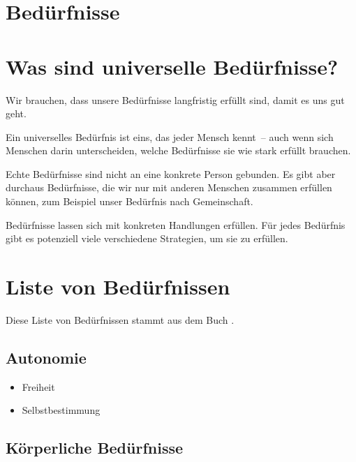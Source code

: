 \section{Bedürfnisse}

\section{Was sind universelle Bedürfnisse?}

Wir brauchen, dass unsere Bedürfnisse langfristig erfüllt sind, damit es uns gut geht.

Ein universelles Bedürfnis ist eins, das jeder Mensch kennt~-- auch wenn sich Menschen darin unterscheiden, welche Bedürfnisse sie wie stark erfüllt brauchen.

Echte Bedürfnisse sind nicht an eine konkrete Person gebunden. Es gibt aber durchaus Bedürfnisse, die wir nur mit anderen Menschen zusammen erfüllen können, zum Beispiel unser Bedürfnis nach Gemeinschaft.

Bedürfnisse lassen sich mit konkreten Handlungen erfüllen. Für jedes Bedürfnis gibt es potenziell viele verschiedene Strategien, um sie zu erfüllen.

\section{Liste von Bedürfnissen}

Diese Liste von Bedürfnissen stammt aus dem Buch \cite[S. 75f]{gfk-fuer-dummies}.

\subsection{Autonomie}

\begin{multicols}{2}
  \begin{itemize}
    \item Freiheit
    \item Selbstbestimmung
  \end{itemize}
\end{multicols}


\subsection{Körperliche Bedürfnisse}

